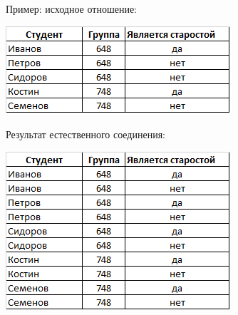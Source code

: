 \documentclass{beamer}
\begin{document}
\begin{frame}
Пример: исходное отношение:
\begin{center}
\includegraphics[scale=0.5]{images/ex-rasp-14.png}
\end{center}
Результат естественного соединения:
\begin{center}
\includegraphics[scale=0.5]{images/ex-rasp-17.png}
\end{center}
\end{frame}
\end{document}
